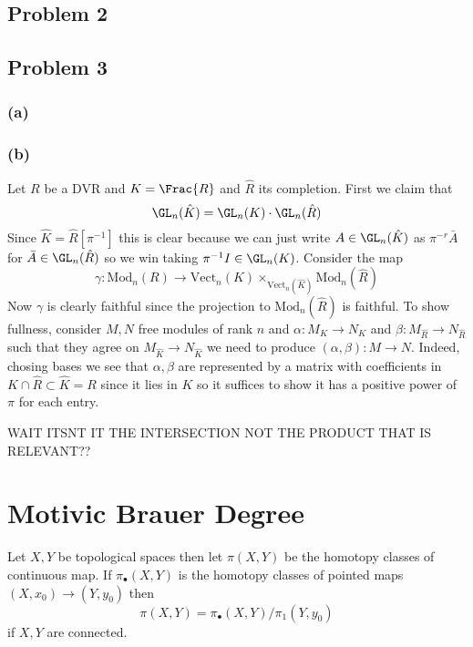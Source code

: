 \documentclass{article}
\newcommand{\Vect}{\mathrm{Vect}}
\begin{document}
\subsection{Problem 2}

\subsection{Problem 3}

\subsubsection{(a)}

\subsubsection{(b)}

\renewcommand{\Mod}{\mathrm{Mod}}
\newcommand{\GW}{\mathrm{GW}}

Let $R$ be a DVR and $K = \Frac{R}$ and $\hat{R}$ its completion. First we claim that
\[ \GL_n(\hat{K}) = \GL_n(K) \cdot \GL_n(\hat{R}) \]
Since $\hat{K} = \hat{R}[\pi^{-1}]$ this is clear because we can just write $A \in \GL_n(\hat{K})$ as $\pi^{-r} \bar{A}$ for $\bar{A} \in \GL_n(\hat{R})$ so we win taking $\pi^{-1} I \in \GL_n(K)$. Consider the map
\[ \gamma : \Mod_n(R) \to \Vect_n(K) \times_{\Vect_n(\hat{K})} \Mod_n(\hat{R}) \]
Now $\gamma$ is clearly faithful since the projection to $\Mod_n(\hat{R})$ is faithful. To show fullness, consider $M, N$ free modules of rank $n$ and $\alpha : M_K \to N_K$ and $\beta : M_{\hat{R}} \to N_{\hat{R}}$ such that they agree on $M_{\hat{K}} \to N_{\hat{K}}$ we need to produce $(\alpha, \beta) : M \to N$. Indeed, chosing bases we see that $\alpha, \beta$ are represented by a matrix with coefficients in $K \cap \hat{R} \subset \hat{K} = R$ since it lies in $K$ so it suffices to show it has a positive power of $\pi$ for each entry. 


WAIT ITSNT IT THE INTERSECTION NOT THE PRODUCT THAT IS RELEVANT??


\section{Motivic Brauer Degree}

Let $X,Y$ be topological spaces then let $\pi(X,Y)$ be the homotopy classes of continuous map. If $\pi_\bullet(X, Y)$ is the homotopy classes of pointed maps $(X, x_0) \to (Y, y_0)$ then 
\[ \pi(X,Y) = \pi_\bullet(X,Y) / \pi_1(Y, y_0) \]
if $X,Y$ are connected. 
\end{document}

